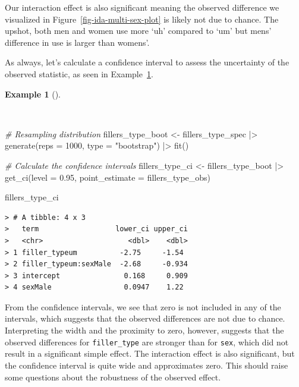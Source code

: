 \documentclass[
  letterpaper,
]{latex/krantz}
\newenvironment{Shaded}{\begin{snugshade}}{\end{snugshade}}
\newcommand{\AttributeTok}[1]{\textcolor[rgb]{0.00,0.00,0.00}{#1}}
\newcommand{\CommentTok}[1]{\textcolor[rgb]{0.00,0.00,0.00}{\textit{#1}}}
\newcommand{\DecValTok}[1]{\textcolor[rgb]{0.00,0.00,0.00}{#1}}
\newcommand{\FloatTok}[1]{\textcolor[rgb]{0.00,0.00,0.00}{#1}}
\newcommand{\FunctionTok}[1]{\textcolor[rgb]{0.00,0.00,0.00}{#1}}
\newcommand{\NormalTok}[1]{\textcolor[rgb]{0.00,0.00,0.00}{#1}}
\newcommand{\OtherTok}[1]{\textcolor[rgb]{0.00,0.00,0.00}{#1}}
\newcommand{\SpecialCharTok}[1]{\textcolor[rgb]{0.00,0.00,0.00}{#1}}
\newcommand{\StringTok}[1]{\textcolor[rgb]{0.00,0.00,0.00}{#1}}
\theoremstyle{definition}
\newtheorem{example}{Example}[chapter]
\theoremstyle{remark}
\begin{document}
Our interaction effect is also significant meaning the observed
difference we visualized in Figure~\ref{fig-ida-multi-sex-plot} is
likely not due to chance. The upshot, both men and women use more `uh'
compared to `um' but mens' difference in use is larger than womens'.

As always, let's calculate a confidence interval to assess the
uncertainty of the observed statistic, as seen in
Example~\ref{exm-ida-num-multi-sex-ci}.

\begin{example}[]\protect\hypertarget{exm-ida-num-multi-sex-ci}{}\label{exm-ida-num-multi-sex-ci}

~

\begin{Shaded}
\begin{Highlighting}[]
\CommentTok{\# Resampling distribution}
\NormalTok{fillers\_type\_boot }\OtherTok{\textless{}{-}}
\NormalTok{  fillers\_type\_spec }\SpecialCharTok{|\textgreater{}}
  \FunctionTok{generate}\NormalTok{(}\AttributeTok{reps =} \DecValTok{1000}\NormalTok{, }\AttributeTok{type =} \StringTok{"bootstrap"}\NormalTok{) }\SpecialCharTok{|\textgreater{}}
  \FunctionTok{fit}\NormalTok{()}

\CommentTok{\# Calculate the confidence intervals}
\NormalTok{fillers\_type\_ci }\OtherTok{\textless{}{-}}
\NormalTok{  fillers\_type\_boot }\SpecialCharTok{|\textgreater{}}
  \FunctionTok{get\_ci}\NormalTok{(}\AttributeTok{level =} \FloatTok{0.95}\NormalTok{, }\AttributeTok{point\_estimate =}\NormalTok{ fillers\_type\_obs)}

\NormalTok{fillers\_type\_ci}
\end{Highlighting}
\end{Shaded}

\begin{verbatim}
> # A tibble: 4 x 3
>   term                  lower_ci upper_ci
>   <chr>                    <dbl>    <dbl>
> 1 filler_typeum          -2.75     -1.54 
> 2 filler_typeum:sexMale  -2.68     -0.934
> 3 intercept               0.168     0.909
> 4 sexMale                 0.0947    1.22
\end{verbatim}

\end{example}

From the confidence intervals, we see that zero is not included in any
of the intervals, which suggests that the observed differences are not
due to chance. Interpreting the width and the proximity to zero,
however, suggests that the observed differences for
\texttt{filler\_type} are stronger than for \texttt{sex}, which did not
result in a significant simple effect. The interaction effect is also
significant, but the confidence interval is quite wide and approximates
zero. This should raise some questions about the robustness of the
observed effect.
\end{document}
